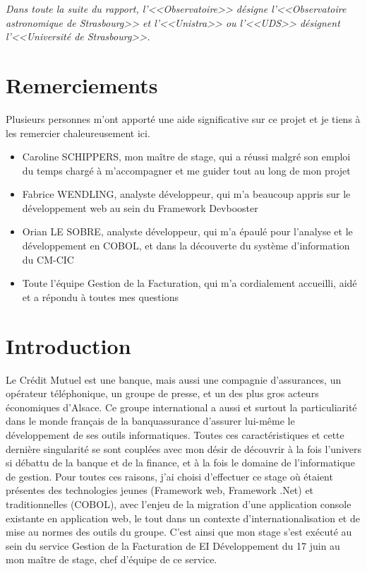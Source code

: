 \documentclass[a4paper,french,8pt]{article}
\begin{document}
\setlength{\columnseprule}{0.5pt}
\tableofcontents

\newpage

\textit{\normalsize Dans toute la suite du rapport, l'<<Observatoire>> désigne l'<<Observatoire astronomique de Strasbourg>>
et l'<<Unistra>> ou l'<<UDS>> désignent l'<<Université de Strasbourg>>.}

\section{Remerciements}

	Plusieurs personnes m’ont apporté une aide significative sur ce projet et je tiens à les remercier chaleureusement ici. 

	\begin{itemize}
		\item Caroline \textsc{SCHIPPERS}, mon maître de stage, qui a réussi malgré son emploi du temps chargé à m’accompagner et me guider tout au long de mon projet
		\item Fabrice \textsc{WENDLING}, analyste développeur, qui m’a beaucoup appris sur le développement web au sein du Framework Devbooster
		\item Orian \textsc{LE SOBRE}, analyste développeur, qui m’a épaulé pour l’analyse et le développement en COBOL, et dans la découverte du système d’information du CM-CIC
		\item Toute l’équipe Gestion de la Facturation, qui m’a cordialement accueilli, aidé et a répondu à toutes mes questions
	\end{itemize}

  
\section{Introduction}

	Le Crédit Mutuel est une banque, mais aussi une compagnie d'assurances, un opérateur téléphonique, un groupe de presse, et un des plus gros acteurs économiques d'Alsace. 
	Ce groupe international a aussi et surtout la particuliarité dans le monde français de la banquassurance d'assurer lui-même le développement de ses outils informatiques. 
	Toutes ces caractéristiques et cette dernière singularité se sont couplées avec mon désir de découvrir à la fois l'univers si débattu de la banque et de la finance, et à la fois le domaine de l'informatique de gestion.
	Pour toutes ces raisons, j'ai choisi d'effectuer ce stage où étaient présentes des technologies jeunes (Framework web, Framework .Net) et traditionnelles (COBOL), avec l'enjeu de la 
	migration d'une application console existante en application web, le tout dans un contexte d'internationalisation et de mise au normes des outils du groupe.
	C'est ainsi que mon stage s'est exécuté au sein du service Gestion de la Facturation de EI Développement du 17 juin au %
	mon maître de stage, chef d'équipe de ce service.
\end{document}
